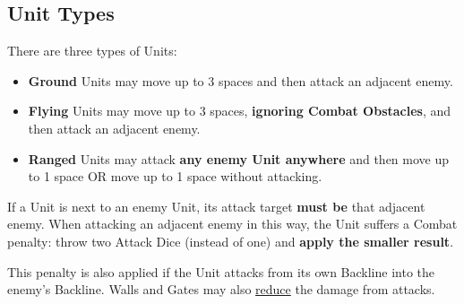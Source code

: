 \begin{multicols}{2}
\vspace*{\fill}

\columnbreak

\subsection*{\hypertarget{Unittype}{Unit Types}}
There are three types of Units:
\begin{itemize}
  \item \textbf{Ground}  Units may move up to 3 spaces and then attack an adjacent enemy.
  \item \textbf{Flying}  Units may move up to 3 spaces, \textbf{ignoring Combat Obstacles}, and then attack an adjacent enemy.
  \item \textbf{Ranged}  Units may attack \textbf{any enemy Unit anywhere} and then move up to 1 space OR move up to 1 space without attacking.
\end{itemize}
If a  Unit is next to an enemy Unit, its attack target \textbf{must be} that adjacent enemy.
When attacking an adjacent enemy in this way, the  Unit suffers a Combat penalty: throw two Attack Dice (instead of one) and \textbf{apply the smaller result}.\par
This penalty is also applied if the  Unit attacks from its own Backline into the enemy's Backline.
Walls and Gates may also \hyperlink{Walls}{reduce} the damage from   attacks.


\end{multicols}
